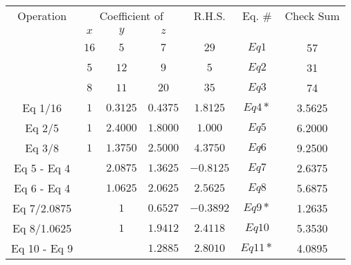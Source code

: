 \documentclass[12pt,class=book,crop=false]{standalone}
\begin{document}
\begin{table}[H]
    \centering
    \begin{tabular}{|c|c|c|c|c|c|c|}
        \hline
        Operation    & \multicolumn{3}{c|}{Coefficient of} & R.H.S.     & Eq. \#     & Check Sum                        \\
        \cline{2-4}
                     & $ x $                               & $ y $      & $ z $      &             &           &        \\\hline
                     & $ 16 $                              & $ 5 $      & $ 7 $      & $ 29 $      & $ Eq1 $   & 57     \\
                     & $ 5 $                               & $ 12 $     & $ 9 $      & $ 5 $       & $ Eq2 $   & 31     \\
                     & $ 8 $                               & $ 11 $     & $ 20 $     & $ 35 $      & $ Eq3 $   & 74     \\\hline
        Eq 1/16      & $ 1 $                               & $ 0.3125 $ & $ 0.4375 $ & $ 1.8125 $  & $ Eq4* $  & 3.5625 \\
        Eq 2/5       & $ 1 $                               & $ 2.4000 $ & $ 1.8000 $ & $ 1.000 $   & $ Eq5 $   & 6.2000 \\
        Eq 3/8       & $ 1 $                               & $ 1.3750 $ & $ 2.5000 $ & $ 4.3750 $  & $ Eq6 $   & 9.2500 \\\hline
        Eq 5 - Eq 4  &                                     & $ 2.0875 $ & $ 1.3625 $ & $ -0.8125 $ & $ Eq7 $   & 2.6375 \\
        Eq 6 - Eq 4  &                                     & $ 1.0625 $ & $ 2.0625 $ & $ 2.5625 $  & $ Eq8 $   & 5.6875 \\\hline
        Eq 7/2.0875  &                                     & $ 1 $      & $ 0.6527 $ & $ -0.3892 $ & $ Eq9* $  & 1.2635 \\
        Eq 8/1.0625  &                                     & $ 1 $      & $ 1.9412 $ & $ 2.4118 $  & $ Eq10 $  & 5.3530 \\\hline
        Eq 10 - Eq 9 &                                     &            & $ 1.2885 $ & $ 2.8010 $  & $ Eq11* $ & 4.0895 \\\hline
    \end{tabular}
\end{table}
\end{document}
